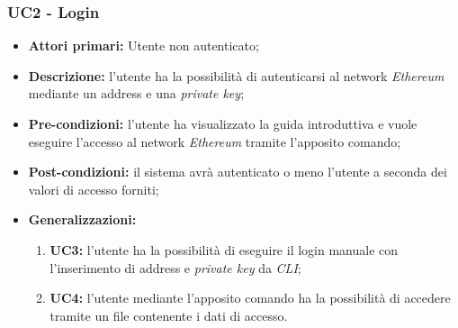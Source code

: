 \subsubsection{UC2 - Login}
\begin{itemize}
	\item \textbf{Attori primari:} Utente non autenticato;
	\item \textbf{Descrizione:} l'utente ha la possibilità di autenticarsi al network \textit{Ethereum\glo} mediante un address e una \textit{private key\glos}; 
	\item \textbf{Pre-condizioni:} l'utente ha visualizzato la guida introduttiva e vuole eseguire l'accesso al network \textit{Ethereum} tramite l'apposito comando;
	\item \textbf{Post-condizioni:} il sistema avrà autenticato o meno l'utente a seconda dei valori di accesso forniti;
	\item \textbf{Generalizzazioni:}
	\begin{enumerate}
		\item \textbf{UC3:} l'utente ha la possibilità di eseguire il login manuale con l'inserimento di address e \textit{private key\glo} da \textit{CLI\glos};
		\item \textbf{UC4:} l'utente mediante l'apposito comando ha la possibilità di accedere tramite un file contenente i dati di accesso.  
	\end{enumerate}
\end{itemize}